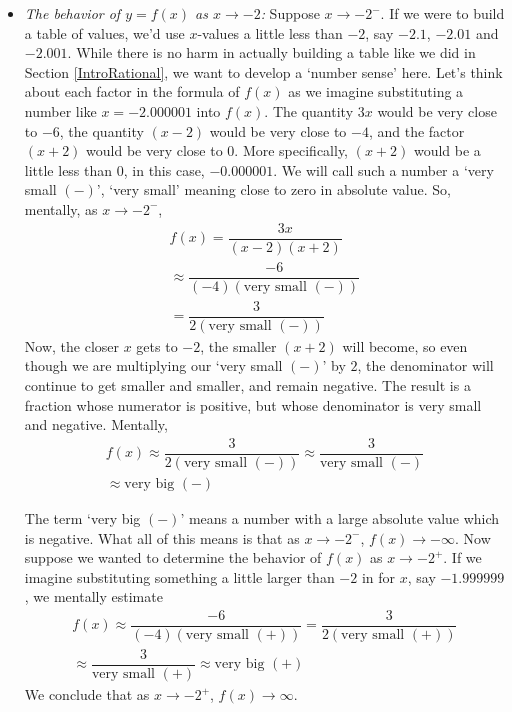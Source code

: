 \begin{ex}
\begin{enumerate}
\begin{itemize}
\item  \textit{The behavior of $y=f(x)$ as $x \rightarrow -2$:}  Suppose $x \rightarrow -2^{-}$.  If we were to build a table of values, we'd use $x$-values a little less than $-2$, say $-2.1$, $-2.01$ and $-2.001$.  While there is no harm in actually building a table like we did in Section \ref{IntroRational}, we want to develop a `number sense' here.  Let's think about each factor in the formula of $f(x)$ as we imagine substituting a number like $x=-2.000001$ into $f(x)$. The quantity $3x$ would be very close to $-6$, the quantity $(x-2)$ would be very close to $-4$, and the factor $(x+2)$ would be very close to $0$.  More specifically, $(x+2)$ would be a little less than $0$, in this case, $-0.000001.$  We will call such a number a `very small $(-)$', `very small' meaning close to zero in absolute value. So, mentally, as $x \rightarrow -2^{-}$,
\begin{multline*}
f(x)   = \dfrac{3x}{(x-2)(x+2)} \\
\approx \dfrac{-6}{(-4)\left( \text{very small $(-)$}\right)} \\
= \dfrac{3}{2 \left( \text{very small $(-)$}\right)}
\end{multline*}
Now, the closer $x$ gets to $-2$, the smaller $(x+2)$ will become, so even though we are multiplying our `very small $(-)$' by $2$, the denominator will continue to get smaller and smaller, and remain negative.  The result is a fraction whose numerator is positive, but whose denominator is very small and negative.  Mentally,
\begin{multline*}
f(x) \approx \dfrac{3}{2 \left( \text{very small $(-)$}\right)} \approx \dfrac{3}{\text{very small $(-)$}} \\
\approx \text{very big $(-)$}
\end{multline*}

The term `very big $(-)$' means a number with a large absolute value which is negative.  What all of this means is that as $x \rightarrow -2^{-}$, $f(x) \rightarrow -\infty$.  Now suppose we wanted to determine the behavior of $f(x)$ as $x \rightarrow -2^{+}$.  If we imagine substituting something a little larger than $-2$ in for $x$, say $-1.999999$, we mentally estimate
\begin{multline*}
f(x) \approx \dfrac{-6}{(-4)\left( \text{very small $(+)$}\right)} = \dfrac{3}{2 \left( \text{very small $(+)$}\right)} \\
\approx \dfrac{3}{\text{very small $(+)$}} \approx \text{very big $(+)$}
\end{multline*}
We conclude that as $x \rightarrow -2^{+}$, $f(x) \rightarrow \infty$.


\end{itemize}
\end{enumerate}
\end{ex}
